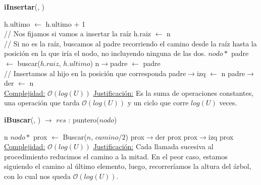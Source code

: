 \begin{Algoritmos}
    \begin{algorithm}
    \caption{\textbf{iInsertar}(, )}
    \begin{algorithmic}
        \State h.ultimo $\gets$ h.ultimo + 1  
        \\
        \State // Nos fijamos si vamos a insertar la raíz
          
            \State h.raiz $\gets$ n  
            \State \Return
        \EndIf
        \\
        \State // Si no es la raíz, buscamos al padre recorriendo el camino desde la raíz hasta la posición en la que iría el nodo, no incluyendo ninguna de las dos.
        \State $nodo*$ padre $\gets$ buscar($h.raiz$, $h.ultimo$)  
        \State n$\to$padre $\gets$ padre  
        \\
        \State // Insertamos al hijo en la posición que corresponda
          
            \State padre$\to$izq $\gets$ n  
        \Else
            \State padre$\to$der $\gets$ n  
        \EndIf
        \\
        \Statex \underline{Complejidad:} $\mathcal{O}(log(U))$
        \Statex \underline{Justificación:} Es la suma de operaciones constantes, una operación que tarda $\mathcal{O}(log(U))$ y un ciclo que corre $log(U)$ veces.
    \end{algorithmic}
    \end{algorithm}

    \begin{algorithm}
    \caption{\textbf{iBuscar}(, ) $\to$ $res$ : puntero($nodo$)}
    \begin{algorithmic}
          
            \State \Return n
        \EndIf
        \State $nodo*$ prox $\gets$ Buscar($n$, $camino / 2$)  
              
                \State \Return prox$\to$der
            \EndIf
            \State \Return prox
        \EndIf
          
            \State \Return prox$\to$izq
        \EndIf
        \State \Return prox
        \\
        \Statex \underline{Complejidad:} $\mathcal{O}(log(U))$
        \Statex \underline{Justificación:} Cada llamada sucesiva al procedimiento reducimos el camino a la mitad. En el peor caso, estamos siguiendo el camino al último elemento, luego, recorreríamos la altura del árbol, con lo cual nos queda $\mathcal{O}(log(U))$.
    \end{algorithmic}
    \end{algorithm}


\end{Algoritmos}
